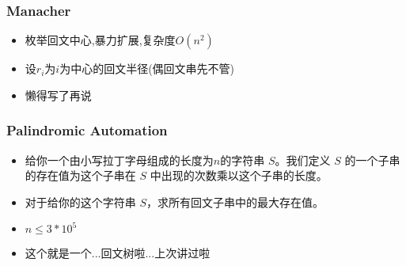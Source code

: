 \documentclass[notheorems]{beamer}
\begin{document}
\begin{frame}
\frametitle{Manacher}
\begin{itemize}[]
\item 枚举回文中心,暴力扩展,复杂度$O(n^2)$
\pause
\item 设$r_i$为$i$为中心的回文半径(偶回文串先不管)
\item 懒得写了再说
\end{itemize}
\end{frame}

\begin{frame}
\frametitle{Palindromic Automation}
\begin{itemize}
\item 给你一个由小写拉丁字母组成的长度为$n$的字符串 $S$。我们定义 $S$ 的一个子串的存在值为这个子串在 $S$ 中出现的次数乘以这个子串的长度。
\item 对于给你的这个字符串 $S$，求所有回文子串中的最大存在值。
\item $n\leq 3*10^5$
\pause
\item 这个就是一个...回文树啦...上次讲过啦
\end{itemize}
\end{frame}
\end{document}
